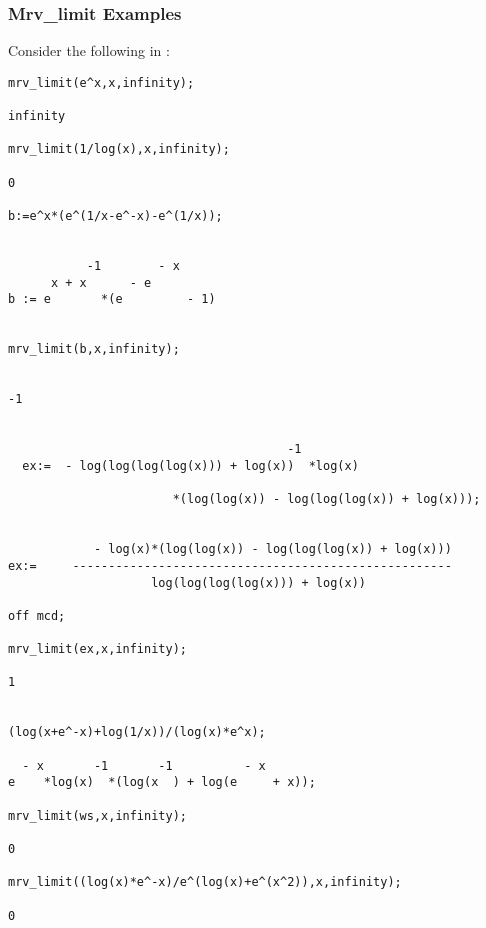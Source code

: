 \subsubsection{Mrv\_limit Examples}
Consider the following in \REDUCE:
\begin{verbatim}
mrv_limit(e^x,x,infinity);

infinity

mrv_limit(1/log(x),x,infinity);

0

b:=e^x*(e^(1/x-e^-x)-e^(1/x));


           -1        - x
      x + x      - e
b := e       *(e         - 1)


mrv_limit(b,x,infinity);


-1


                                       -1
  ex:=  - log(log(log(log(x))) + log(x))  *log(x)

                       *(log(log(x)) - log(log(log(x)) + log(x)));


            - log(x)*(log(log(x)) - log(log(log(x)) + log(x)))
ex:=     -----------------------------------------------------
                    log(log(log(log(x))) + log(x))

off mcd;

mrv_limit(ex,x,infinity);

1


(log(x+e^-x)+log(1/x))/(log(x)*e^x);

  - x       -1       -1          - x
e    *log(x)  *(log(x  ) + log(e     + x));

mrv_limit(ws,x,infinity);

0

mrv_limit((log(x)*e^-x)/e^(log(x)+e^(x^2)),x,infinity);

0

\end{verbatim}
\normalsize
